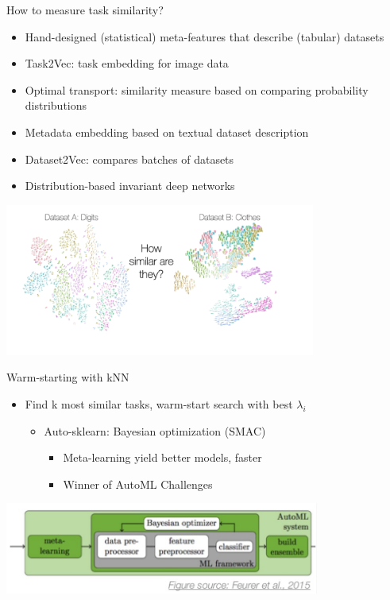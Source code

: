 \documentclass[aspectratio=169,t,handout,xcolor={usenames,dvipsnames}]{beamer}
\begin{document}
\begin{frame}{How to measure task similarity?}
    \begin{itemize}
        \item Hand-designed (statistical) meta-features that describe (tabular) datasets
        \item Task2Vec: task embedding for image data
        \item Optimal transport: similarity measure based on comparing probability distributions
        \item Metadata embedding based on textual dataset description
        \item Dataset2Vec: compares batches of datasets
        \item Distribution-based invariant deep networks
    \end{itemize}
    \centering\includegraphics[height=5cm]{image/Picture1.png}
\end{frame}
\begin{frame}{Warm-starting with kNN}
    \begin{itemize}
        \item Find k most similar tasks, warm-start search with best $\lambda _i$
        \begin{itemize}
            \item Auto-sklearn: Bayesian optimization (SMAC)
            \begin{itemize}
                \item Meta-learning yield better models, faster
                \item Winner of AutoML Challenges
            \end{itemize}
        \end{itemize}
    \end{itemize}
    \centering\includegraphics[height=3cm]{image/Jietu20220328-204247.jpg}
    
\end{frame}
\end{document}
